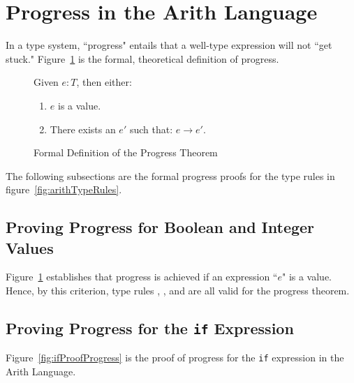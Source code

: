 \documentclass{report}
\newcommand{\rel}[1]{\mbox{\sc [#1]}}
\begin{document}
\eject
\section{Progress in the Arith Language}\label{sec:progress}

In a type system, ``progress" entails that a well-type expression will not ``get stuck."  Figure~\ref{fig:progressTheorem} is the formal, theoretical definition of progress.

\begin{figure}[H]

	Given $e : T$, then either:
	
	\begin{enumerate}
	
      \item $e$ is a value.
      
      \item There exists an $e'$ such that: $e \rightarrow e'$.
	
	\end{enumerate}
	
  \caption{Formal Definition of the Progress Theorem}\label{fig:progressTheorem}
\end{figure}

The following subsections are the formal progress proofs for the type rules in figure~\ref{fig:arithTypeRules}.

\subsection{Proving Progress for Boolean and Integer Values}

Figure~\ref{fig:progressTheorem} establishes that progress is achieved if an expression ``$e$" is a value.  Hence, by this criterion, type rules \rel{T-True}, \rel{T-False}, and \rel{T-Int} are all valid for the progress theorem.

\subsection{Proving Progress for the \texttt{if} Expression}

Figure~\ref{fig:ifProofProgress} is the proof of progress for the \texttt{if} expression in the Arith Language.
\end{document}
